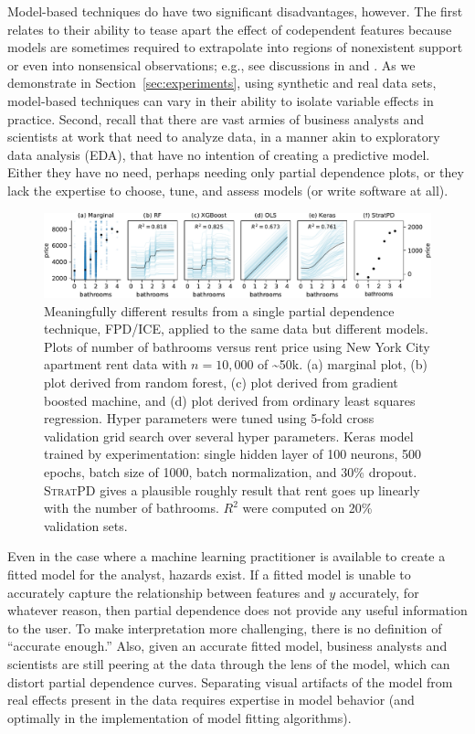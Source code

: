 \documentclass[]{article} %
\newcommand{\secref}[1]{Section~\ref{#1}}
\newcommand{\spd}{\fontfamily{cmr}\textsc{\small StratPD}}
\begin{document}
Model-based techniques do have two significant disadvantages, however. 
The first relates to their ability to tease apart the effect of codependent features because models are sometimes required to extrapolate into regions of nonexistent support or even into nonsensical observations; e.g., see discussions in \citet{ALE} and \citet{fanova}.  As we demonstrate in \secref{sec:experiments}, using synthetic and real data sets, model-based techniques can vary in their ability to isolate variable effects in practice.  Second, recall that there are vast armies of business analysts and scientists at work that need to analyze data, in a manner akin to exploratory data analysis (EDA), that have no intention of creating a predictive model.  Either they have no need, perhaps needing only partial dependence plots, or they lack the expertise to choose, tune, and assess models (or write software at all).

\begin{figure}
\begin{center}
\includegraphics[scale=0.6]{images/bathrooms_vs_price.pdf}\vspace{-3mm}
\caption{\small Meaningfully different results from a single partial dependence technique, FPD/ICE, applied to the same data but different models. Plots of number of bathrooms versus rent price using New York City apartment rent data \citep{rent} with $n=10,000$ of \textasciitilde50k. (a) marginal plot, (b) plot derived from random forest, (c)  plot derived from gradient boosted machine, and (d) plot derived from ordinary least squares regression. Hyper parameters were tuned using 5-fold cross validation grid search over several hyper parameters. Keras model trained by experimentation: single hidden layer of 100 neurons, 500 epochs, batch size of 1000, batch normalization, and 30\% dropout. \spd{} gives a plausible roughly result that rent goes up linearly with the number of bathrooms. $R^2$ were computed on 20\% validation sets.\vspace{-7mm}}
\label{fig:baths_price}
\end{center}
\end{figure}

Even in the case where a machine learning practitioner is available to create a fitted model for the analyst, hazards exist. If a fitted model is unable to accurately capture the relationship between features and $y$ accurately, for whatever reason, then partial dependence does not provide any useful information to the user.  To make interpretation more challenging, there is no definition of ``accurate enough.'' Also, given an accurate fitted model, business analysts and scientists are still peering at the data through the lens of the model, which can distort partial dependence curves. Separating visual artifacts of the model from real effects present in the data requires expertise in model behavior (and optimally in the implementation of model fitting algorithms). 
\end{document}
